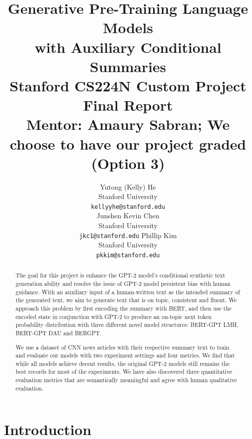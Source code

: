 \documentclass{article}
\title{
  Generative Pre-Training Language Models \\
  with Auxiliary Conditional Summaries\\
  \vspace{0.3em}
  \small{\normalfont Stanford CS224N Custom Project Final Report\\
  \textbf{Mentor:} Amaury Sabran; We choose to have our project graded (Option 3)}  %
}
\author{
  Yutong (Kelly) He \\
  Stanford University \\
  \texttt{kellyyhe@stanford.edu} \\
  \And
  Junshen Kevin Chen \\
  Stanford University\\
  \texttt{jkc1@stanford.edu}
  \And
  Phillip Kim \\
  Stanford University \\
  \texttt{pkkim@stanford.edu}
}
\begin{document}
\maketitle

\vspace{-1em}



\begin{abstract}

The goal for this project is enhance the GPT-2\cite{gpt2} model's conditional synthetic text generation ability and resolve the issue of GPT-2 model persistent bias with human guidance. With an auxiliary input of a human-written text as the intended summary of the generated text, we aim to generate text that is on topic, consistent and fluent. We approach this problem by first encoding the summary with BERT\cite{bert}, and then use the encoded state in conjunction with GPT-2 to produce an on-topic next token probability distribution with three different novel model structures: BERT-GPT LMH, BERT-GPT DAU and BERGPT.

We use a dataset of CNN news articles with their respective summary text to train and evaluate our models with two experiment settings and four metrics. We find that while all models achieve decent results, the original GPT-2 models still remains the best records for most of the experiments. We have also discovered three quantitative evaluation metrics that are semantically meaningful and agree with human qualitative evaluation.
\end{abstract}



\section{Introduction }

\end{document}
